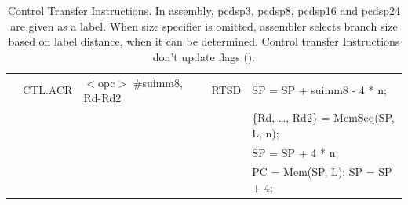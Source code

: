 \begin{table}
\begin{subtable}{\linewidth}
\begin{center}
\begin{tabular}{lllll}
                   & CTL.ACR           & $<$opc$>$ \#suimm8, Rd-Rd2            & RTSD              & SP = SP + suimm8 - 4 * n;                                                     \\
                   &                   &                                       &                   & \{Rd, \ldots, Rd2\} = MemSeq(SP, L, n);                                       \\
                   &                   &                                       &                   & SP = SP + 4 * n;                                                              \\
                   &                   &                                       &                   & PC = Mem(SP, L); SP = SP + 4;                                                 \\ \hline
\end{tabular}
\end{center}
\captionsetup{font=scriptsize, labelfont=scriptsize}
\caption{Control Transfer Instructions. In assembly, pcdsp3, pcdsp8, pcdsp16 and pcdsp24 are given
as a label. When size specifier is omitted, assembler selects branch size based on label distance,
when it can be determined. Control transfer Instructions don't update flags (\flags{----}).}
\end{subtable}

\vspace{0.5cm}


\end{table}
